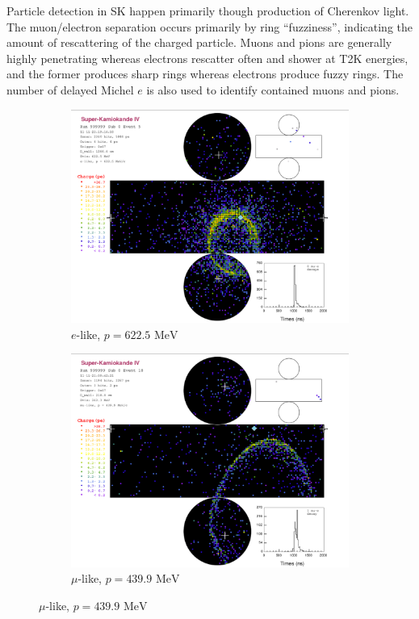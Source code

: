 Particle detection in SK happen primarily though production of Cherenkov light. The muon/electron separation occurs primarily by ring ``fuzziness'', indicating the amount of rescattering of the charged particle. Muons and pions are generally highly penetrating whereas electrons rescatter often and shower at T2K energies, and the former produces sharp rings whereas electrons produce fuzzy rings. The number of delayed Michel $e$ is also used to identify contained muons and pions.
\begin{figure}[h]
	\begin{subfigure}[t]{0.48\textwidth}
		\includegraphics[width=\textwidth, trim={0mm 0mm 0mm 3mm}, clip,page=1]{figures/det_chap/sk/elike.pdf}
		\caption{$e$-like, $p=622.5\text{ MeV}$}
	\end{subfigure}
	\begin{subfigure}[t]{0.48\textwidth}
		\includegraphics[width=\textwidth, trim={0mm 0mm 0mm 3mm}, clip,page=1]{figures/det_chap/sk/mulike.pdf}
		\caption{$\mu$-like, $p=439.9\text{ MeV}$}
	\end{subfigure}
\end{figure}

